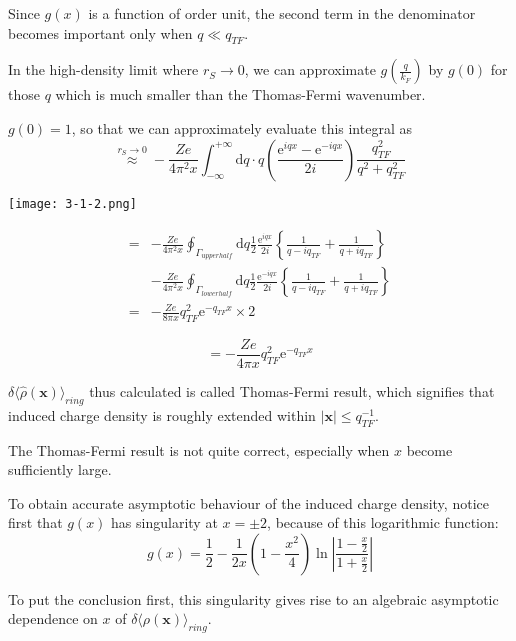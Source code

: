 \begin{itemize}
Since $g(x)$ is a function of order unit, the second term in the denominator becomes important only when $q \ll q_{TF}$.

In the high-density limit where $r_S \rightarrow 0$, we can approximate $g(\frac{q}{k_F})$ by $g(0)$ for those $q$ which is much smaller than the Thomas-Fermi wavenumber.

$g(0)=1$, so that we can approximately evaluate this integral as
\[\overset{r_S \rightarrow 0}{\approx} - \frac{Z e}{4\pi^2 x} \int_{-\infty}^{+\infty}\mathrm{d}q \cdot q\left( \frac{\mathrm{e}^{i qx}-\mathrm{e}^{-i qx}}{2i} \right)\frac{q_{TF}^2}{q^2+q_{TF}^2}\]

\begin{center} \label{Fig3.1.2}
\texttt{[image: 3-1-2.png]}
\end{center}

\[\begin{split}
=& - \frac{Z e}{4\pi^2 x}\oint_{\Gamma_{upper half}} \mathrm{d}q \frac{1}{2}\frac{\mathrm{e}^{i q x}}{2i}\left\{ \frac{1}{q-i q_{TF}}+\frac{1}{q+i q_{TF}} \right\}\\
&-\frac{Z e}{4\pi^2 x}\oint_{\Gamma_{lower half}} \mathrm{d}q \frac{1}{2}\frac{\mathrm{e}^{-i q x}}{2i}\left\{ \frac{1}{q-i q_{TF}}+\frac{1}{q+i q_{TF}} \right\}\\
=& - \frac{Z e}{8 \pi x}q_{TF}^2 \mathrm{e}^{-q_{TF} x} \times 2
\end{split}\]

\begin{equation} \label{Eqs3.1.29}
=- \frac{Z e}{4 \pi x}q_{TF}^2 \mathrm{e}^{-q_{TF} x}
\end{equation}

$\delta \langle \hat{\rho}(\mathbf{x}) \rangle_{ring}$ thus calculated is called Thomas-Fermi result, which signifies that induced charge density is roughly extended within $|\mathbf{x}| \leq q_{TF}^{-1}$.

The Thomas-Fermi result is not quite correct, especially when $x$ become sufficiently large.

To obtain accurate asymptotic behaviour of the induced charge density, notice first that $g(x)$ has singularity at $x=\pm 2$, because of this logarithmic function:
\[ g(x) = \frac{1}{2} - \frac{1}{2x} \left( 1-\frac{x^2}{4} \right) \ln \left| \frac{1-\frac{x}{2}}{1+\frac{x}{2}} \right| \]

To put the conclusion first, this singularity gives rise to an algebraic asymptotic dependence on $x$ of $\delta\langle \rho(\mathbf{x})\rangle_{ring}$.


\end{itemize}
